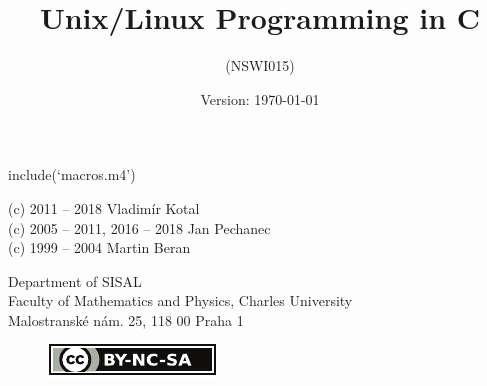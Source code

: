 
include(`macros.m4')

\begin{slide}
\centerslidestrue
\begin{center}
\title{\LARGE Unix/Linux Programming in C}
\author{(NSWI015)}
\date{Version: \rm\today}
\maketitle


\vspace{2ex}
{\small (c) 2011 -- 2018 Vladim\'{i}r Kotal}\\
{\small (c) 2005 -- 2011, 2016 -- 2018 Jan Pechanec}\\
{\small (c) 1999 -- 2004 Martin Beran}

\vspace{2ex}
Department of SISAL\\
Faculty of Mathematics and Physics, Charles University\\
Malostransk\'{e} n\'{a}m. 25, 118 00 Praha 1 

\begin{figure}[htb!]
  \includegraphics[scale=0.75]{img/by-nc-sa-small}
\end{figure}
\end{center}
\end{slide}

